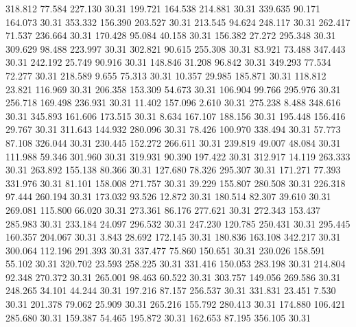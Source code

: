  318.812   77.584  227.130        30.31
 199.721  164.538  214.881        30.31
 339.635   90.171  164.073        30.31
 353.332  156.390  203.527        30.31
 213.545   94.624  248.117        30.31
 262.417   71.537  236.664        30.31
 170.428   95.084   40.158        30.31
 156.382   27.272  295.348        30.31
 309.629   98.488  223.997        30.31
 302.821   90.615  255.308        30.31
  83.921   73.488  347.443        30.31
 242.192   25.749   90.916        30.31
 148.846   31.208   96.842        30.31
 349.293   77.534   72.277        30.31
 218.589    9.655   75.313        30.31
  10.357   29.985  185.871        30.31
 118.812   23.821  116.969        30.31
 206.358  153.309   54.673        30.31
 106.904   99.766  295.976        30.31
 256.718  169.498  236.931        30.31
  11.402  157.096    2.610        30.31
 275.238    8.488  348.616        30.31
 345.893  161.606  173.515        30.31
   8.634  167.107  188.156        30.31
 195.448  156.416   29.767        30.31
 311.643  144.932  280.096        30.31
  78.426  100.970  338.494        30.31
  57.773   87.108  326.044        30.31
 230.445  152.272  266.611        30.31
 239.819   49.007   48.084        30.31
 111.988   59.346  301.960        30.31
 319.931   90.390  197.422        30.31
 312.917   14.119  263.333        30.31
 263.892  155.138   80.366        30.31
 127.680   78.326  295.307        30.31
 171.271   77.393  331.976        30.31
  81.101  158.008  271.757        30.31
  39.229  155.807  280.508        30.31
 226.318   97.444  260.194        30.31
 173.032   93.526   12.872        30.31
 180.514   82.307   39.610        30.31
 269.081  115.800   66.020        30.31
 273.361   86.176  277.621        30.31
 272.343  153.437  285.983        30.31
 233.184   24.097  296.532        30.31
 247.230  120.785  250.431        30.31
 295.445  160.357  204.067        30.31
   3.843   28.692  172.145        30.31
 180.836  163.108  342.217        30.31
 300.064  112.196  291.393        30.31
 337.477   75.860  150.651        30.31
 230.026  158.591   55.102        30.31
 320.702   23.593  258.225        30.31
 331.416  150.053  283.198        30.31
 214.804   92.348  270.372        30.31
 265.001   98.463   60.522        30.31
 303.757  149.056  269.586        30.31
 248.265   34.101   44.244        30.31
 197.216   87.157  256.537        30.31
 331.831   23.451    7.530        30.31
 201.378   79.062   25.909        30.31
 265.216  155.792  280.413        30.31
 174.880  106.421  285.680        30.31
 159.387   54.465  195.872        30.31
 162.653   87.195  356.105        30.31
